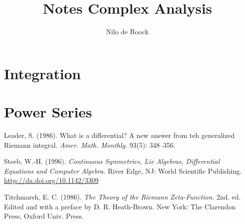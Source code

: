 \documentclass{book}
\theoremstyle{theorem}
\theoremstyle{definition}
\begin{document}
    \title{Notes Complex Analysis}

    \author{Nilo de Roock}

    \maketitle

    \chapter{Integration}
    

    \chapter{Power Series}
    



    \begin{thebibliography}{3}

        Leader, S. (1986). What is a differential? A new answer from teh generalized Riemann integral. {\it Amer. Math. Monthly.\/} 93(5): 348--356.

        Steeb, W.-H. (1996). \textit{Continuous Symmetries, Lie Algebras, Differential Equations and Computer Algebra.\/} River Edge, NJ: World Scientific Publishing.  \href{http://dx.doi.org/10.1142/3309}{\url{http://dx.doi.org/10.1142/3309}}

        Titchmarsh, E. C. (1986). {\it The Theory of the Riemann Zeta-Function.\/} 2nd. ed. Edited and with a preface by D. R. Heath-Brown. New York: The Clarendon Press, Oxford Univ. Press.

    \end{thebibliography}
\end{document}
